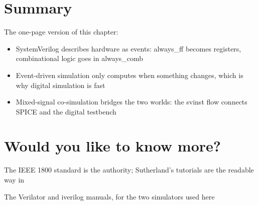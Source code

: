 \begin{Shaded}
\begin{Highlighting}[]
\end{Highlighting}
\end{Shaded}

\section{Summary}\label{summary}

The one-page version of this chapter:

\begin{itemize}
\tightlist
\item
  SystemVerilog describes hardware as events: always\_ff becomes
  registers, combinational logic goes in always\_comb
\item
  Event-driven simulation only computes when something changes, which is
  why digital simulation is fast
\item
  Mixed-signal co-simulation bridges the two worlds: the svinst flow
  connects SPICE and the digital testbench
\end{itemize}

\section{Would you like to know
more?}\label{would-you-like-to-know-more}

The IEEE 1800 standard is the authority; Sutherland's tutorials are the
readable way in

The Verilator and iverilog manuals, for the two simulators used here

\label{refs}
\begin{CSLReferences}{0}{0}
\CSLLeftMargin{{[}1{]} }%

\end{CSLReferences}

